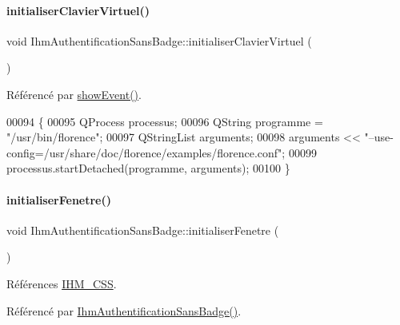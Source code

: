 \paragraph{\texorpdfstring{initialiser\+Clavier\+Virtuel()}{initialiserClavierVirtuel()}}
{\footnotesize\ttfamily void Ihm\+Authentification\+Sans\+Badge\+::initialiser\+Clavier\+Virtuel (\begin{DoxyParamCaption}{ }\end{DoxyParamCaption})\hspace{0.3cm}{\ttfamily [private]}}



Référencé par \hyperlink{class_ihm_authentification_sans_badge_ad60d540d145d0bb940ccbb0850de2c35}{show\+Event()}.


\begin{DoxyCode}
00094 \{
00095     QProcess processus;
00096     QString programme = \textcolor{stringliteral}{"/usr/bin/florence"};
00097     QStringList arguments;
00098     arguments << \textcolor{stringliteral}{"--use-config=/usr/share/doc/florence/examples/florence.conf"};
00099     processus.startDetached(programme, arguments);
00100 \}
\end{DoxyCode}
\mbox{\label{class_ihm_authentification_sans_badge_a5804d43d13e39e3e4890f7b08c89cb6c}} 
\paragraph{\texorpdfstring{initialiser\+Fenetre()}{initialiserFenetre()}}
{\footnotesize\ttfamily void Ihm\+Authentification\+Sans\+Badge\+::initialiser\+Fenetre (\begin{DoxyParamCaption}{ }\end{DoxyParamCaption})\hspace{0.3cm}{\ttfamily [private]}}



Références \hyperlink{e-stock_8h_a7185157bd11830373a0f95d0dc88b2c3}{I\+H\+M\+\_\+\+C\+SS}.



Référencé par \hyperlink{class_ihm_authentification_sans_badge_aace6d9eebcab9fee429fe9dbb6840f15}{Ihm\+Authentification\+Sans\+Badge()}.


